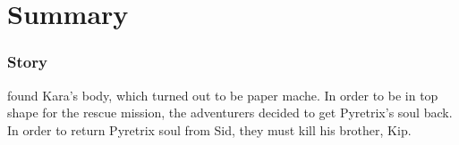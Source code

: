 \part*{Summary}
\section{Story}
 found Kara's body, which turned out to be paper mache. 
In order to be in top shape for the rescue mission, the adventurers decided to get Pyretrix's soul back.
In order to return Pyretrix soul from Sid, they must kill his brother, Kip.
